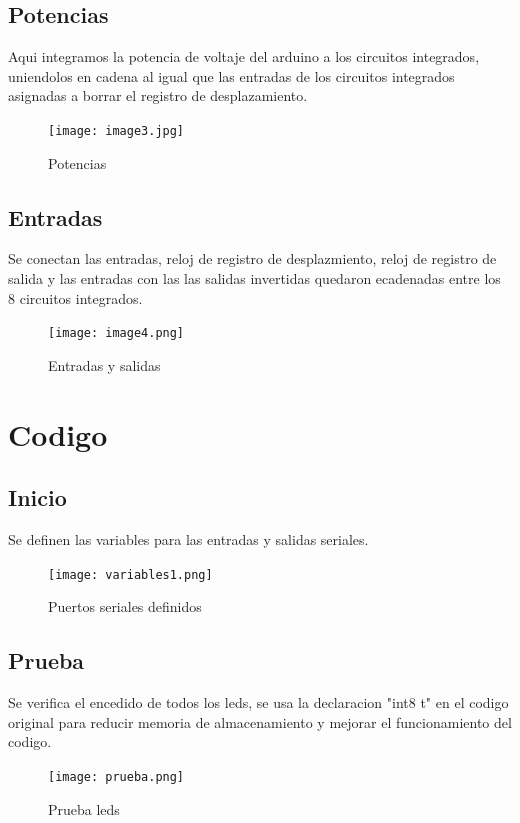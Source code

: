 \documentclass{article}
\begin{document}
\subsection{Potencias}
Aqui integramos la potencia de voltaje del arduino a los circuitos integrados, uniendolos en cadena al igual que las entradas de los circuitos integrados asignadas a borrar el registro de desplazamiento.
    \begin{figure}[h]
    \texttt{[image: image3.jpg]}
    \centering
    \caption{Potencias}
    \label{fig:image3}
    \end{figure}

\subsection{Entradas}
Se conectan las entradas, reloj de registro de desplazmiento, reloj de registro de salida y las entradas con las las salidas invertidas quedaron ecadenadas entre los 8 circuitos integrados.\cite{datasheet}
    \begin{figure}[h]
    \texttt{[image: image4.png]}
    \centering
    \caption{Entradas y salidas}
    \label{fig:image4}
    \end{figure}

\section{Codigo} 
\label{Elaboracion}
\subsection{Inicio}
Se definen las variables para las entradas y salidas seriales.
    \begin{figure}[h]
    \texttt{[image: variables1.png]}
    \centering
    \caption{Puertos seriales definidos}
    \label{fig:variables1}
    \end{figure}

\subsection{Prueba}
Se verifica el encedido de todos los leds, se usa la declaracion "int8 t" en el codigo original para reducir memoria de almacenamiento y mejorar el funcionamiento del codigo.
    \begin{figure}[h]
    \texttt{[image: prueba.png]}
    \centering
    \caption{Prueba leds}
    \label{fig:prueba}
    \end{figure}
\end{document}
